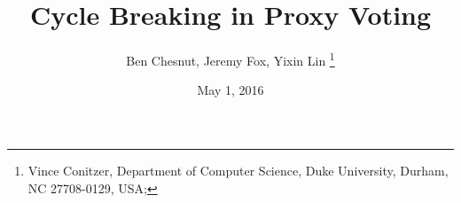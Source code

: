\documentclass{sig-alternate-10}
\begin{document}
  
\title{Cycle Breaking in Proxy Voting
}
\date{May 1, 2016}

\author{
Ben Chesnut, Jeremy Fox, Yixin Lin \thanks{%
Vince Conitzer, Department of Computer Science, Duke University, Durham, NC
27708-0129, USA;}}

\maketitle
%






{\small		


}
\end{document}
